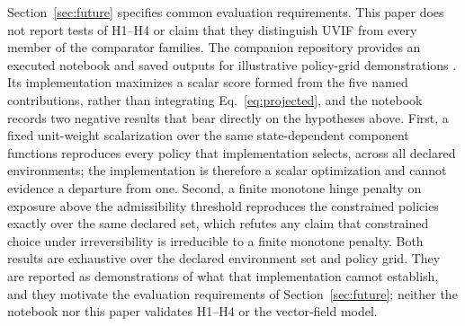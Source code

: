 Section~\ref{sec:future} specifies common evaluation requirements. This paper does not report tests of H1--H4 or claim that they distinguish UVIF from every member of the comparator families. The companion repository provides an executed notebook and saved outputs for illustrative policy-grid demonstrations \citep{Hamam2026GitHub}. Its implementation maximizes a scalar score formed from the five named contributions, rather than integrating Eq.~\eqref{eq:projected}, and the notebook records two negative results that bear directly on the hypotheses above. First, a fixed unit-weight scalarization over the same state-dependent component functions reproduces every policy that implementation selects, across all declared environments; the implementation is therefore a scalar optimization and cannot evidence a departure from one. Second, a finite monotone hinge penalty on exposure above the admissibility threshold reproduces the constrained policies exactly over the same declared set, which refutes any claim that constrained choice under irreversibility is irreducible to a finite monotone penalty. Both results are exhaustive over the declared environment set and policy grid. They are reported as demonstrations of what that implementation cannot establish, and they motivate the evaluation requirements of Section~\ref{sec:future}; neither the notebook nor this paper validates H1--H4 or the vector-field model.
